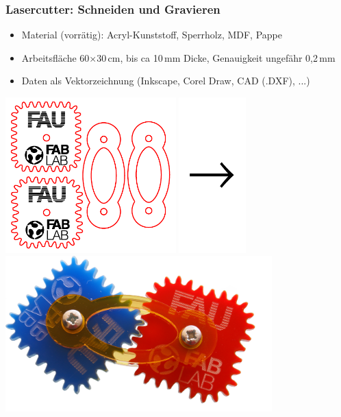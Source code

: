 \documentclass[t]{beamer}
\begin{document}
\begin{frame}
    \frametitle{Lasercutter: Schneiden und Gravieren}
    \begin{itemize}
        \item Material (vorrätig): Acryl-Kunststoff, Sperrholz, MDF, Pappe
        \item Arbeitsfläche 60$\times$30\,cm, bis ca 10\,mm Dicke, Genauigkeit ungefähr 0,2\,mm
        \item Daten als Vektorzeichnung (Inkscape, Corel Draw, CAD (.DXF), ...)
    \end{itemize}

    \bigskip

    \bigskip
    \begin{center}
        \includegraphics[height=6cm]{../img/SquareGears.pdf}
        \includegraphics[height=6cm]{../img/pfeil.pdf}
        \includegraphics[height=6cm]{../img/zahnraeder2b-skaliert.png}
    \end{center}

\end{frame}
\end{document}
